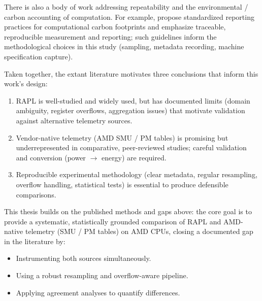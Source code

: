 There is also a body of work addressing repeatability and the
environmental / carbon accounting of computation. For example,
\textcite{GreenAlgos} propose standardized reporting practices
for computational carbon footprints and emphasize traceable,
reproducible measurement and reporting; such guidelines inform the
methodological choices in this study (sampling, metadata recording,
machine specification capture).

Taken together, the extant literature motivates three conclusions that
inform this work's design:

\begin{enumerate}
  \item \gls{RAPL} is well-studied and widely used, but has documented limits
    (domain ambiguity, register overflows, aggregation issues) that
    motivate validation against alternative telemetry sources.
  \item Vendor-native telemetry (AMD \gls{SMU} / \gls{PM} tables) is promising but
    underrepresented in comparative, peer-reviewed studies; careful
    validation and conversion (power $\rightarrow$ energy) are required.
  \item Reproducible experimental methodology (clear metadata, regular
    resampling, overflow handling, statistical tests) is essential to
    produce defensible comparisons.
\end{enumerate}

This thesis builds on the published methods and gaps above: the core
goal is to provide a systematic, statistically grounded comparison of
\gls{RAPL} and AMD-native telemetry (\gls{SMU} / \gls{PM} tables) on AMD \gls{CPU}s,
closing a documented gap in the literature by:

\begin{itemize}
  \item Instrumenting both sources simultaneously.
  \item Using a robust resampling and overflow-aware pipeline.
  \item Applying agreement analyses to quantify differences.
\end{itemize}
